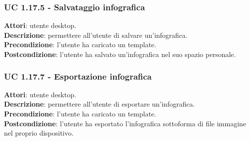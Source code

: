\subsubsection{UC 1.17.5 - Salvataggio infografica}{
	\label{uc1.17.5}
	\textbf{Attori}: utente desktop. \\
	\textbf{Descrizione}: permettere all’utente di salvare un’infografica. \\
	\textbf{Precondizione}: l'utente ha caricato un template.	\\
	\textbf{Postcondizione}: l'utente ha salvato un’infografica nel suo spazio personale.
	}
\subsubsection{UC 1.17.7 - Esportazione infografica}{
	\label{uc1.17.7}
	\textbf{Attori}: utente desktop. \\
	\textbf{Descrizione}: permettere all’utente di esportare un’infografica. \\
	\textbf{Precondizione}: l'utente ha caricato un template.	\\
	\textbf{Postcondizione}: l'utente ha esportato l'infografica sottoforma di file immagine nel proprio dispositivo.
	}